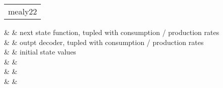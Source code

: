 \begin{haddockdesc}
\begin{interactive}
\end{interactive}\par
           

\item[\begin{tabular}{@{}l}
mealy22
\end{tabular}]\haddockbegindoc
\haddockbeginargs
\haddockdecltt{::} &  & next state function, tupled with consumption / production
 rates \\
                                                                                 \haddockdecltt{->} &  & outpt decoder, tupled with consumption / production rates \\
                                                                                                                                                                                  \haddockdecltt{->} & \haddockdecltt{[st]} & initial state values \\
                                                                                                                                                                                                                              \haddockdecltt{->} &  & \\
                                                                                                                                                                                                                                                                               \haddockdecltt{->} &  & \\
                                                                                                                                                                                                                                                                                                                                \haddockdecltt{->} &  & \\

\end{haddockdesc}
